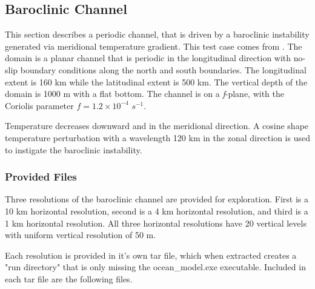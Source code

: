 \subsection{Baroclinic Channel}
\label{subsec:baroclinic_channel_description}
This section describes a periodic channel, that is driven by a baroclinic
instability generated via meridional temperature gradient. This test case comes from
\cite{Ilicak_ea12om}. The domain is a planar channel that is periodic in the
longitudinal direction with no-slip boundary conditions along the north and
south boundaries. The longitudinal extent is 160 km while the
latitudinal extent is 500 km. The vertical depth of the domain is 1000 m with a
flat bottom. The channel is on a {\it f}-plane, with the Coriolis parameter $f
= 1.2 \times 10^{-4}$ $s^{-1}$.

Temperature decreases downward and in the meridional direction. A cosine shape temperature
perturbation with a
wavelength 120 km in the zonal direction is used to instigate the baroclinic instability. 

\subsubsection{Provided Files}
\label{subsubsec:baroclinic_channel_files}
Three resolutions of the baroclinic channel are provided for exploration. First
is a 10 km horizontal resolution, second is a 4 km horizontal resolution, and
third is a 1 km horizontal resolution. All three horizontal resolutions have 20
vertical levels with uniform vertical resolution of 50 m.

Each resolution is provided in it's own tar file, which when extracted creates
a "run directory" that is only missing the ocean\_model.exe executable.
Included in each tar file are the following files.

